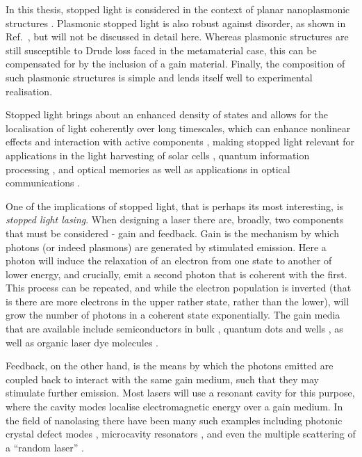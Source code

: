 In this thesis, stopped light is considered in the context of planar
nanoplasmonic structures \cite{Karalis2005}.
Plasmonic stopped light is also robust against disorder, as shown in
Ref.~\cite{Tsakmakidis2014}, but will not be discussed in detail here.
Whereas plasmonic structures are still susceptible to Drude loss faced in the
metamaterial case, this can be compensated for by the inclusion of a gain
material.
Finally, the composition of such plasmonic structures is simple and lends
itself well to experimental realisation.

Stopped light brings about an enhanced density of states \cite{Yao2009} and
allows for the localisation of light coherently over long timescales, which can
enhance nonlinear effects \cite{Franken1961} and interaction with active
components \cite{Lakowicz2004,Fu2011}, making stopped light relevant for
applications in the light harvesting of solar cells
\cite{Aubry2010,Jang2011,Callahan2012}, quantum
information processing \cite{Liu2001}, and optical memories \cite{Zhang2009} as
well as applications in optical communications \cite{Mok2005}.

One of the implications of stopped light, that is perhaps its most interesting,
is \emph{stopped light lasing}.
When designing a laser there are, broadly, two components that must be
considered - gain and feedback.
Gain is the mechanism by which photons (or indeed plasmons) are generated by
stimulated emission.
Here a photon will induce the relaxation of an electron from one state to
another of lower energy, and crucially, emit a second photon that is coherent
with the first.
This process can be repeated, and while the electron population is inverted
(that is there are more electrons in the upper rather state, rather than the
lower), will grow the number of photons in a
coherent state exponentially.
The gain media that are available include semiconductors in bulk
\cite{Kenyon2002}, quantum dots \cite{Plum2009} and wells \cite{Carrere2006},
as well as organic laser dye molecules \cite{Sperber1988}.

Feedback, on the other hand, is the means by which the photons emitted are
coupled back to interact with the same gain medium, such that they may stimulate
further emission.
Most lasers will use a resonant cavity for this purpose, where the cavity modes 
localise electromagnetic energy over a gain medium.
In the field of nanolasing there have been many such examples including
photonic crystal defect modes \cite{Painter1999,Altug2006}, microcavity
resonators
\cite{Iga1988,McCall1992,Vahala2003},
and even the multiple scattering of a “random laser”
\cite{Cao2003,Wiersma2008}.

